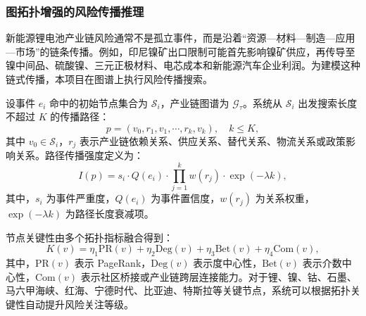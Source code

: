 ﻿\documentclass[12pt,a4paper]{article}
\begin{document}
\subsubsection{图拓扑增强的风险传播推理}

新能源锂电池产业链风险通常不是孤立事件，而是沿着“资源—材料—制造—应用—市场”的链条传播。例如，印尼镍矿出口限制可能首先影响镍矿供应，再传导至镍中间品、硫酸镍、三元正极材料、电芯成本和新能源汽车企业利润。为建模这种链式传播，本项目在图谱上执行风险传播搜索。

设事件 $e_i$ 命中的初始节点集合为 $\mathcal{S}_i$，产业链图谱为 $\mathcal{G}_{\tau}$。系统从 $\mathcal{S}_i$ 出发搜索长度不超过 $K$ 的传播路径：
\begin{equation}
p=(v_0,r_1,v_1,\cdots,r_k,v_k), \quad k \le K,
\end{equation}
其中 $v_0 \in \mathcal{S}_i$，$r_j$ 表示产业链依赖关系、供应关系、替代关系、物流关系或政策影响关系。路径传播强度定义为：
\begin{equation}
I(p)=s_i \cdot Q(e_i) \cdot
\prod_{j=1}^{k} w(r_j) \cdot
\exp(-\lambda k),
\end{equation}
其中，$s_i$ 为事件严重度，$Q(e_i)$ 为事件置信度，$w(r_j)$ 为关系权重，$\exp(-\lambda k)$ 为路径长度衰减项。

节点关键性由多个拓扑指标融合得到：
\begin{equation}
K(v)=
\eta_1 \text{PR}(v)
+
\eta_2 \text{Deg}(v)
+
\eta_3 \text{Bet}(v)
+
\eta_4 \text{Com}(v),
\end{equation}
其中，$\text{PR}(v)$ 表示 PageRank，$\text{Deg}(v)$ 表示度中心性，$\text{Bet}(v)$ 表示介数中心性，$\text{Com}(v)$ 表示社区桥接或产业链跨层连接能力。对于锂、镍、钴、石墨、马六甲海峡、红海、宁德时代、比亚迪、特斯拉等关键节点，系统可以根据拓扑关键性自动提升风险关注等级。
\end{document}
